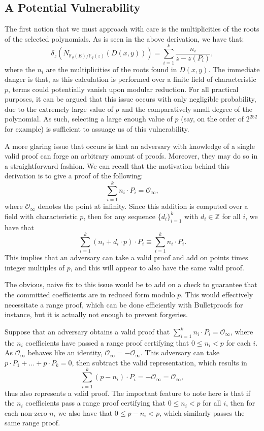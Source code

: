 \documentclass{article}
\theoremstyle{definition}
\newcommand{\6}{\mathbf}
\newcommand{\7}{\mathcal}
\begin{document}
\subsection{A Potential Vulnerability}
\hspace{\parindent}The first notion that we must approach with care is the multiplicities of the roots of the selected polynomials. 
As is seen in the above derivation, we have that:
$$\delta_z(N_{\mathbb{F}_q(E)/\mathbb{F}_q(z)}(D(x,y))) = \sum_{i = 1}^k \frac{n_i}{z-z(P_i)},$$
where the $n_i$ are the multiplicities of the roots found in $D(x,y)$. 
The immediate danger is that, as this calculation is performed over a finite field of characteristic $p$, terms could potentially vanish upon modular reduction. 
For all practical purposes, it can be argued that this issue occurs with only negligible probability, due to the extremely large value of $p$ and the comparatively small degree of the polynomial. As such, selecting a large enough value of $p$ (say, on the order of $2^{252}$ for example) is sufficient to assuage us of this vulnerability. 

\medskip 

A more glaring issue that occurs is that an adversary with knowledge of a single valid proof can forge an arbitrary amount of proofs. Moreover, they may do so in a straightforward fashion.
We can recall that the motivation behind this derivation is to give a proof of the following:
$$\sum_{i = 1}^k n_i \cdot P_i = \mathcal{O}_{\infty},$$
where $\mathcal{O}_{\infty}$ denotes the point at infinity. 
Since this addition is computed over a field with characteristic $p$, then for any sequence $\{d_i\}_{i = 1}^k$ with $d_i \in \mathbb{Z}$ for all $i$, we have that
$$\sum_{i = 1}^k (n_i + d_i \cdot p) \cdot P_i \equiv \sum_{i = 1}^k n_i \cdot P_i.$$
This implies that an adversary can take a valid proof and add on points times integer multiples of $p$, and this will appear to also have the same valid proof.

\medskip 

The obvious, naive fix to this issue would be to add on a check to guarantee that the committed coefficients are in reduced form modulo $p$. 
This would effectively necessitate a range proof, which can be done efficiently with Bulletproofs \cite{bullet} for instance, but it is actually not enough to prevent forgeries.

\medskip 

Suppose that an adversary obtains a valid proof that $\sum_{i = 1}^k n_i \cdot P_i = \mathcal{O}_{\infty}$, where the $n_i$ coefficients have passed a range proof certifying that $0 \leq n_i < p$ for each $i$. 
As $\mathcal{O}_{\infty}$ behaves like an identity, $\mathcal{O}_{\infty} = -\mathcal{O}_{\infty}$. 
This adversary can take $p \cdot P_1 + \dots + p \cdot P_k = 0$, then subtract the valid representation,
which results in 
$$\sum_{i = 1}^k (p - n_i) \cdot P_i = -\mathcal{O}_{\infty} = \mathcal{O}_{\infty},$$
thus also represents a valid proof. 
The important feature to note here is that if the $n_i$ coefficients pass a range proof certifying that $0 \leq n_i < p$ for all $i$, then for each non-zero $n_i$ we also have that $0 \leq p - n_i < p$, which similarly passes the same range proof. 
\end{document}
